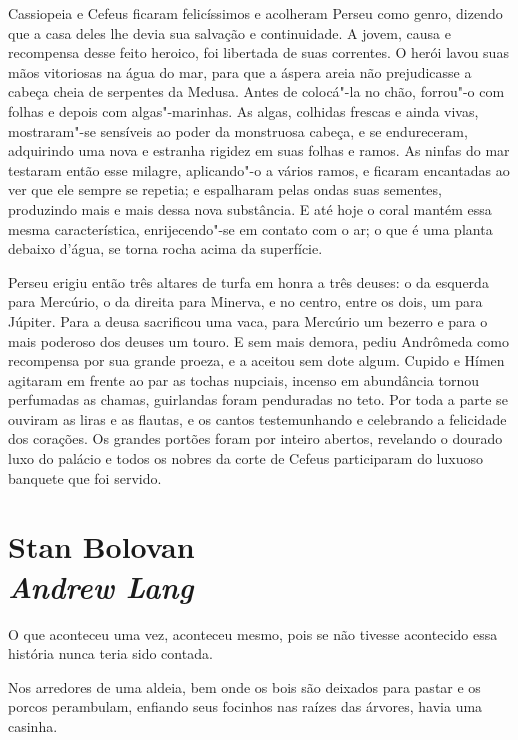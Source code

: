 Cassiopeia e Cefeus ficaram felicíssimos e acolheram Perseu como
genro, dizendo que a casa deles lhe devia sua salvação e
continuidade. A jovem, causa e recompensa desse feito heroico, foi
libertada de suas correntes. O herói lavou suas mãos vitoriosas na
água do mar, para que a áspera areia não prejudicasse a cabeça
cheia de serpentes da Medusa. Antes de colocá"-la no chão, forrou"-o com
folhas e depois com algas"-marinhas. As algas, colhidas frescas e
ainda vivas, mostraram"-se sensíveis ao poder da monstruosa cabeça, e
se endureceram, adquirindo uma nova e estranha rigidez em suas folhas
e ramos. As ninfas do mar testaram então esse milagre, aplicando"-o a
vários ramos, e ficaram encantadas ao ver que ele sempre se repetia;
e espalharam pelas ondas suas sementes, produzindo mais e mais dessa
nova substância. E até hoje o coral mantém essa mesma característica,
enrijecendo"-se em contato com o ar; o que é uma planta debaixo d'água, 
se torna rocha acima da superfície.

Perseu erigiu então três altares de turfa em honra a três deuses: o da
esquerda para Mercúrio, o da direita para Minerva, e no centro, entre
os dois, um para Júpiter. Para a deusa sacrificou uma vaca, para
Mercúrio um bezerro e para o mais poderoso dos deuses um touro. E
sem mais demora, pediu Andrômeda como recompensa por sua grande
proeza, e a aceitou sem dote algum. Cupido e Hímen agitaram em frente
ao par as tochas nupciais, incenso em abundância tornou perfumadas
as chamas, guirlandas foram penduradas no teto. Por toda a parte se
ouviram as liras e as flautas, e os cantos testemunhando e celebrando
a felicidade dos corações. Os grandes portões foram por inteiro
abertos, revelando o dourado luxo do palácio e todos os nobres da
corte de Cefeus participaram do luxuoso banquete que foi servido.

\chapter[Stan Bolovan\\{\itshape Andrew Lang}]{Stan Bolovan\\{\LARGE\itshape Andrew Lang}}

O que aconteceu uma vez, aconteceu mesmo, pois se não tivesse
acontecido essa história nunca teria sido contada.\linebreak

Nos arredores de uma aldeia, bem onde os bois são deixados para pastar
e os porcos perambulam, enfiando seus focinhos nas raízes das árvores,
havia uma casinha. 

